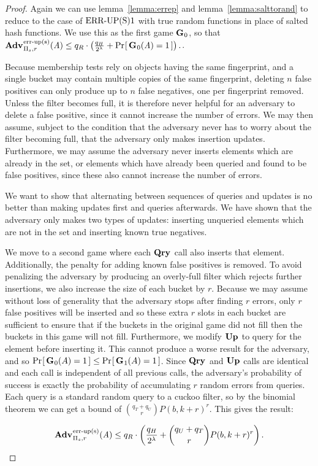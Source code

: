 \begin{proof}
Again we can use lemma~\ref{lemma:errep} and lemma~\ref{lemma:salttorand} to reduce to the case of $\textnormal{ERR\mbox{-}UP(S)}1$ with true random functions in place of salted hash functions. We use this as the first game $\mathbf{G}\hspace{0.5pt}_0$, so that $\Adv{\erreps}_{\struct_s,r}(\advA) \le q_R \cdot \left(\frac{q_H}{2^\lambda} + \Prob{\G_0(\advA) = 1}\right).$.

Because membership tests rely on objects having the same fingerprint, and a single bucket may contain multiple copies of the same fingerprint, deleting $n$ false positives can only produce up to $n$ false negatives, one per fingerprint removed. Unless the filter becomes full, it is therefore never helpful for an adversary to delete a false positive, since it cannot increase the number of errors. We may then assume, subject to the condition that the adversary never has to worry about the filter becoming full, that the adversary only makes insertion updates. Furthermore, we may assume the adversary never inserts elements which are already in the set, or elements which have already been queried and found to be false positives, since these also cannot increase the number of errors.

We want to show that alternating between sequences of queries and updates is no better than making updates first and queries afterwards. We have shown that the adversary only makes two types of updates: inserting unqueried elements which are not in the set and inserting known true negatives.

We move to a second game where each $\mathbf{Qry}\hspace{0.5pt}$ call also inserts that element. Additionally, the penalty for adding known false positives is removed. To avoid penalizing the adversary by producing an overly-full filter which rejects further insertions, we also increase the size of each bucket by $r$. Because we may assume without loss of generality that the adversary stops after finding $r$ errors, only $r$ false positives will be inserted and so these extra $r$ slots in each bucket are sufficient to ensure that if the buckets in the original game did not fill then the buckets in this game will not fill. Furthermore, we modify $\mathbf{Up}\hspace{0.5pt}$ to query for the element before inserting it. This cannot produce a worse result for the adversary, and so $\Pr\hspace{-1pt}\left[\,\mathbf{G}\hspace{0.5pt}_0(A) = 1\,\right] \le \Pr\hspace{-1pt}\left[\,\mathbf{G}\hspace{0.5pt}_1(A) = 1\,\right]$. Since $\mathbf{Qry}\hspace{0.5pt}$ and $\mathbf{Up}\hspace{0.5pt}$ calls are identical and each call is independent of all previous calls, the adversary's probability of success is exactly the probability of accumulating $r$ random errors from queries. Each query is a standard random query to a cuckoo filter, so by the binomial theorem we can get a bound of $\binom{q_T+q_U}{r}P(b,k+r)^r$. This gives the result:

$$\Adv{\erreps}_{\struct_s,r}(\advA) \le q_R \cdot \left(\frac{q_H}{2^\lambda} + \binom{q_U+q_T}{r}P(b,k+r)^r\right).$$\missingqed

\end{proof}

